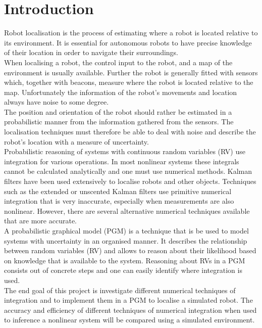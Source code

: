 \documentclass[12pt,oneside,openany,a4paper, %
afrikaans,english,
]{memoir}
\numberwithin{equation}{chapter}
\begin{document}
\chapter{Introduction}
Robot localisation is the process of estimating where a robot is located relative to its environment. It is essential for autonomous robots to have precise knowledge of their location in order to navigate their surroundings.\\
When localising a robot, the control input to the robot, and a map of the environment is usually available. Further the robot is generally fitted with sensors which, together with beacons, measure where the robot is located relative to the map. Unfortunately the information of the robot's movements and location always have noise to some degree.\\
The position and orientation of the robot should rather be estimated in a probabilistic manner from the information gathered from the sensors. The localisation techniques must therefore be able to deal with noise and describe the robot's location with a measure of uncertainty.\\
Probabilistic reasoning of systems with continuous random variables (RV) use integration for various operations. In most nonlinear systems these integrals cannot be calculated analytically and one must use numerical methods. Kalman filters have been used extensively to localise robots and other objects. Techniques such as the extended or unscented Kalman filters use primitive numerical integration that is very inaccurate, especially when measurements are also nonlinear. However, there are several alternative numerical techniques available that are more accurate.\\
A probabilistic graphical model (PGM) is a technique that is be used to model systems with uncertainty in an organised manner. It describes the relationship between random variables (RV) and allows to reason about their likelihood based on knowledge that is available to the system. Reasoning about RVs in a PGM consists out of concrete steps and one can easily identify where integration is used.\\
The end goal of this project is investigate different numerical techniques of integration and to implement them in a PGM to localise a simulated robot. The accuracy and efficiency of different techniques of numerical integration when used to inference a nonlinear system will be compared using a simulated environment.
\setcounter{secnumdepth}{2}
\end{document}

